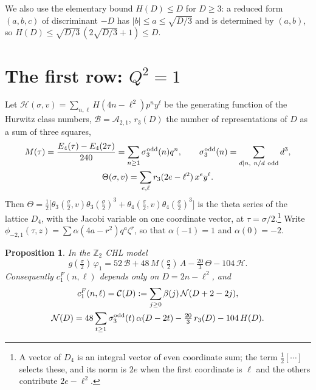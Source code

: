 \documentclass[11pt]{amsart}
\newtheorem{proposition}[theorem]{Proposition}
\theoremstyle{definition}
\newcommand{\ZZ}{\mathbb{Z}}
\newcommand{\cB}{\mathcal B}
\newcommand{\cH}{\mathcal H}
\newcommand{\pA}{\phi_{-2,1}}
\begin{document}
We also use the elementary bound $H(D)\le D$ for $D\ge3$: a reduced form $(a,b,c)$ of discriminant $-D$ has $|b|\le a\le\sqrt{D/3}$ and is determined by $(a,b)$, so $H(D)\le\sqrt{D/3}\,(2\sqrt{D/3}+1)\le D$.

\section{The first row: \texorpdfstring{$Q^2=1$}{Q2=1}}\label{sec:Q1}

Let $\cH(\sigma,v)=\sum_{n,\ell}H(4n-\ell^2)p^ny^\ell$ be the generating function of the Hurwitz class numbers, $\cB=\mathcal A_{2,1}$, $r_3(D)$ the number of representations of $D$ as a sum of three squares,
\[
\begin{gathered}
M(\tau)=\frac{E_4(\tau)-E_4(2\tau)}{240}=\sum_{n\ge1}\sigma_3^{\rm odd}(n)q^n,\qquad \sigma_3^{\rm odd}(n)=\sum_{d\mid n,\ n/d\ \text{odd}}d^3,\\
\Theta(\sigma,v)=\sum_{e,\ell}r_3(2e-\ell^2)\,x^ey^\ell .
\end{gathered}
\]
Then $\Theta=\frac12\big[\theta_3(\frac\sigma2,v)\theta_3(\frac\sigma2)^3+\theta_4(\frac\sigma2,v)\theta_4(\frac\sigma2)^3\big]$ is the theta series of the lattice $D_4$, with the Jacobi variable on one coordinate vector, at $\tau=\sigma/2$.\footnote{A vector of $D_4$ is an integral vector of even coordinate sum; the term $\frac12[\cdots]$ selects these, and its norm is $2e$ when the first coordinate is $\ell$ and the others contribute $2e-\ell^2$.} Write $\pA(\tau,z)=\sum\alpha(4a-r^2)q^a\zeta^r$, so that $\alpha(-1)=1$ and $\alpha(0)=-2$.

\begin{proposition}\label{prop:Q1closed}
In the $\ZZ_2$ CHL model
\begin{equation}\label{eq:Q1closed}
g(\tfrac\sigma2)\,\varphi_1=52\,\cB+48\,M(\tfrac\sigma2)\,A-\tfrac{20}3\,\Theta-104\,\cH .
\end{equation}
Consequently $c^F_1(n,\ell)$ depends only on $D=2n-\ell^2$, and
\begin{equation}\label{eq:Q1coeff}
\begin{gathered}
c^F_1(n,\ell)=\mathcal C(D):=\sum_{j\ge0}\beta(j)\,\mathcal N(D+2-2j),\\
\mathcal N(D)=48\sum_{t\ge1}\sigma_3^{\rm odd}(t)\,\alpha(D-2t)-\tfrac{20}3\,r_3(D)-104\,H(D).
\end{gathered}
\end{equation}
\end{proposition}
\end{document}
